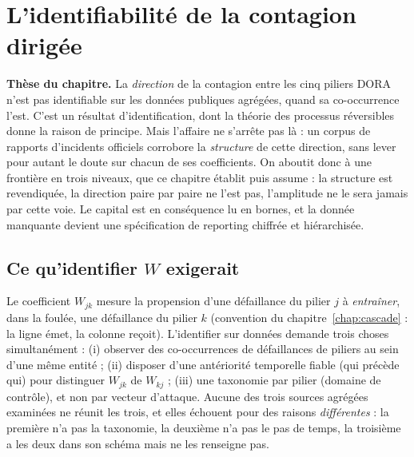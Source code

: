 \chapter{L'identifiabilité de la contagion dirigée}
\label{ch:identifiabilite}

\begin{cle}
\textbf{Thèse du chapitre.} La \emph{direction} de la contagion entre les cinq piliers DORA
n'est pas identifiable sur les données publiques agrégées, quand sa co-occurrence
l'est. C'est un résultat d'identification, dont la théorie des processus réversibles donne
la raison de principe. Mais l'affaire ne s'arrête pas là : un corpus de rapports
d'incidents officiels corrobore la \emph{structure} de cette direction, sans lever pour autant
le doute sur chacun de ses coefficients. On aboutit donc à une frontière en trois
niveaux, que ce chapitre établit puis assume : la structure est revendiquée, la direction paire
par paire ne l'est pas, l'amplitude ne le sera jamais par cette voie. Le capital est en
conséquence lu en bornes, et la donnée manquante devient une spécification de reporting
chiffrée et hiérarchisée.
\end{cle}

\section{Ce qu'identifier $W$ exigerait}

Le coefficient $W_{jk}$ mesure la propension d'une défaillance du pilier $j$ à
\emph{entraîner}, dans la foulée, une défaillance du pilier $k$ (convention
du chapitre~\ref{chap:cascade} : la ligne émet, la colonne reçoit). L'identifier sur données
demande trois choses simultanément : (i) observer des co-occurrences de défaillances de
piliers au sein d'une même entité ; (ii) disposer d'une antériorité temporelle fiable
(qui précède qui) pour distinguer $W_{jk}$ de $W_{kj}$ ; (iii) une taxonomie par pilier
(domaine de contrôle), et non par vecteur d'attaque. Aucune des trois sources agrégées examinées
ne réunit les trois, et elles échouent pour des raisons \emph{différentes} : la première n'a pas
la taxonomie, la deuxième n'a pas le pas de temps, la troisième a les deux dans son schéma mais
ne les renseigne pas.

